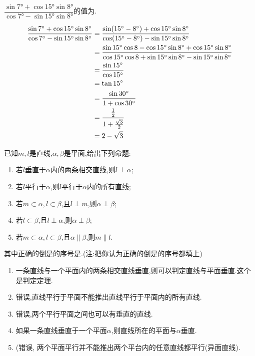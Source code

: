 \begin{questions}
	\question
	$\dfrac{\sin{\ang{7}}+\cos{\ang{15}}\sin{\ang{8}}}{\cos{\ang{7}}-\sin{\ang{15}}\sin{\ang{8}}}$的值为\fillin[$2-\sqrt{3}$][2cm].

	\begin{solution}
		\begin{align*}
			\frac{\sin{\ang{7}}+\cos{\ang{15}}\sin{\ang{8}}}{\cos{\ang{7}}-\sin{\ang{15}}\sin{\ang{8}}}
			 & = \frac{\sin(\ang{15}-\ang{8}) + \cos\ang{15}\sin\ang8}{\cos(\ang{15}-\ang8) -\sin\ang{15}\sin\ang8} \\
			 & = \frac{\sin\ang{15}\cos8 - \cos\ang{15}\sin\ang8 + \cos\ang{15}\sin\ang8}
			{\cos\ang{15}\cos8 + \sin\ang{15}\sin\ang8 - \sin\ang{15}\sin\ang8}                                     \\
			 & = \frac{\sin\ang{15}}{\cos\ang{15}}                                                                  \\
			 & = \tan\ang{15}                                                                                       \\
			 & = \frac{\sin\ang{30}}{1+\cos\ang{30}}                                                                \\
			 & = \frac{\frac12}{1+\frac{\sqrt{3}}{2}}                                                               \\
			 & = 2 - \sqrt{3}
		\end{align*}
	\end{solution}

	\question 已知$m,l$是直线,$\alpha,\beta$是平面,给出下列命题:
	\begin{enumerate}[label=\protect\circled{\arabic*}]
		\item 若$l$垂直于$\alpha$内的两条相交直线,则$l\perp \alpha$;
		\item 若$l$平行于$\alpha$,则$l$平行于$\alpha$内的所有直线;
		\item 若$m\subset\alpha, l\subset\beta$,且$l\perp m$,则$\alpha\perp\beta$;
		\item 若$l\subset\beta$,且$l\perp\alpha$,则$\alpha\perp\beta$;
		\item 若$m\subset\alpha,l\subset\beta$,且$\alpha\parallel\beta$,则$m\parallel l$.
	\end{enumerate}
	其中正确的倒是的序号是.(注:把你认为正确的倒是的序号都填上)

	\begin{solution}
		\begin{enumerate}[label=\protect\circled{\arabic*}]
			\item 一条直线与一个平面内的两条相交直线垂直,则可以判定直线与平面垂直.这个是判定定理.
			\item 错误,直线平行于平面不能推出直线平行于平面内的所有直线.
			\item 错误,两个平行平面之间也可以有垂直的直线.
			\item 如果一条直线垂直于一个平面$\alpha$,则直线所在的平面与$\alpha$垂直.
			\item (错误, 两个平面平行并不能推出两个平台内的任意直线都平行(异面直线).
		\end{enumerate}
	\end{solution}


\end{questions}
